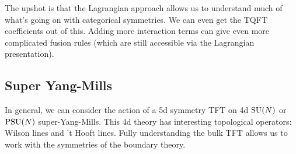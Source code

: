 The upshot is that the Lagrangian approach allows us to understand much of what's going on with categorical symmetries.
We can even get the TQFT coefficients out of this.
Adding more interaction terms can give even more complicated fusion rules (which are still accessible via the Lagrangian presentation).

\subsection{Super Yang-Mills}

In general, we can consider the action of a 5d symmetry TFT on 4d $\mathrm{SU}(N)$ or $\mathrm{PSU}(N)$ super-Yang-Mills.
This 4d theory has interesting topological operators: Wilson lines and 't Hooft lines.
Fully understanding the bulk TFT allows us to work with the symmetries of the boundary theory.

